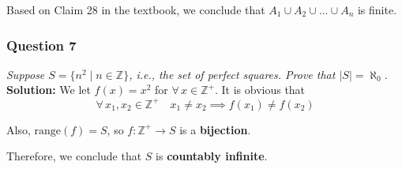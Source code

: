 \documentclass[
	letterpaper, %
	11pt, %
]{CSUniSchoolLabReport}
\begin{document}
Based on Claim 28 in the textbook, we conclude that $A_1 \cup A_2 \cup \ldots \cup A_n$ is finite.

\pagebreak

\subsubsection*{Question 7}
\textit{Suppose $S = \{n^2 \mid n \in \mathbb{Z}\}$, i.e., the set of perfect squares. Prove that $|S| = \aleph_0$.} \\

\textbf{Solution:} We let $f(x) = x^2$ for $\forall\, x \in \mathbb{Z}^+$.
It is obvious that
\[
\forall\, x_1, x_2 \in \mathbb{Z}^+ \quad x_1 \neq x_2 \implies f(x_1) \neq f(x_2)
\]

Also, $\mathrm{range}(f) = S$, so $f: \mathbb{Z}^+ \to S$ is a \textbf{bijection}.

Therefore, we conclude that $S$ is \textbf{countably infinite}.
\end{document}
